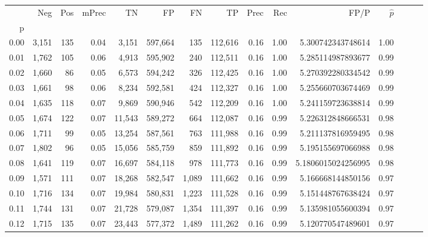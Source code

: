 \begin{tabular}{rrrrrrrrrrrrrrr}
\toprule
{} &     Neg &    Pos & mPrec &       TN &       FP &       FN &       TP &  Prec &   Rec &                  FP/P & $\hat{p}$ \\
p    &         &        &       &          &          &          &          &       &       &                       &           \\
\midrule
0.00 &   3,151 &    135 &  0.04 &    3,151 &  597,664 &      135 &  112,616 &  0.16 &  1.00 &     5.300742343748614 &      1.00 \\
0.01 &   1,762 &    105 &  0.06 &    4,913 &  595,902 &      240 &  112,511 &  0.16 &  1.00 &     5.285114987893677 &      0.99 \\
0.02 &   1,660 &     86 &  0.05 &    6,573 &  594,242 &      326 &  112,425 &  0.16 &  1.00 &     5.270392280334542 &      0.99 \\
0.03 &   1,661 &     98 &  0.06 &    8,234 &  592,581 &      424 &  112,327 &  0.16 &  1.00 &     5.255660703674469 &      0.99 \\
0.04 &   1,635 &    118 &  0.07 &    9,869 &  590,946 &      542 &  112,209 &  0.16 &  1.00 &     5.241159723638814 &      0.99 \\
0.05 &   1,674 &    122 &  0.07 &   11,543 &  589,272 &      664 &  112,087 &  0.16 &  0.99 &     5.226312848666531 &      0.98 \\
0.06 &   1,711 &     99 &  0.05 &   13,254 &  587,561 &      763 &  111,988 &  0.16 &  0.99 &     5.211137816959495 &      0.98 \\
0.07 &   1,802 &     96 &  0.05 &   15,056 &  585,759 &      859 &  111,892 &  0.16 &  0.99 &     5.195155697066988 &      0.98 \\
0.08 &   1,641 &    119 &  0.07 &   16,697 &  584,118 &      978 &  111,773 &  0.16 &  0.99 &    5.1806015024256995 &      0.98 \\
0.09 &   1,571 &    111 &  0.07 &   18,268 &  582,547 &    1,089 &  111,662 &  0.16 &  0.99 &     5.166668144850156 &      0.97 \\
0.10 &   1,716 &    134 &  0.07 &   19,984 &  580,831 &    1,223 &  111,528 &  0.16 &  0.99 &     5.151448767638424 &      0.97 \\
0.11 &   1,744 &    131 &  0.07 &   21,728 &  579,087 &    1,354 &  111,397 &  0.16 &  0.99 &     5.135981055600394 &      0.97 \\
0.12 &   1,715 &    135 &  0.07 &   23,443 &  577,372 &    1,489 &  111,262 &  0.16 &  0.99 &     5.120770547489601 &      0.97 \\

\end{tabular}
